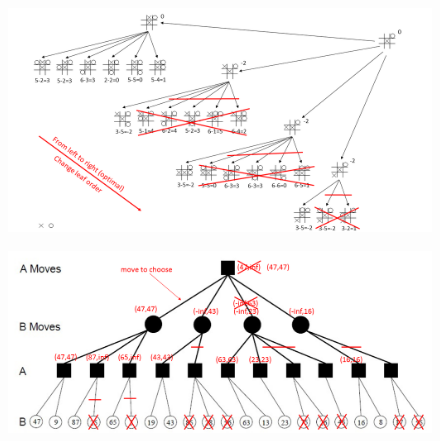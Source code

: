 \documentclass{article}
\begin{document}
    \begin{figure}[ht]
    \includegraphics[width=\textwidth]{figure/Slide4.PNG}
    \caption{}
    \end{figure}
    \begin{figure}[ht]
    \includegraphics[width=\textwidth]{figure/Slide5.PNG}
    \caption{}
    \end{figure}
\end{document}
